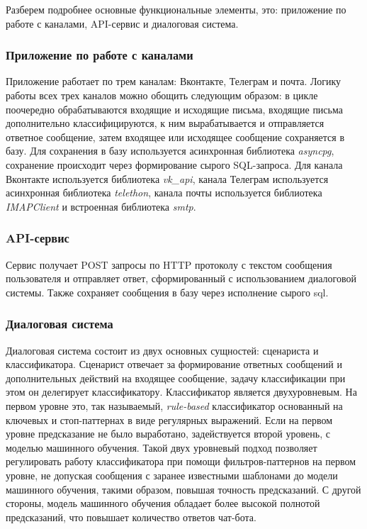     Разберем подробнее основные функциональные элементы, это:
    приложение по работе с каналами, API-сервис и диалоговая система.
    
    \subsubsection*{Приложение по работе с каналами}
    Приложение работает по трем каналам: Вконтакте, Телеграм и почта. Логику работы всех трех каналов можно обощить
    следующим образом: в цикле поочередно обрабатываются входящие  и исходящие письма, входящие письма дополнительно
    классифицируются, к ним вырабатывается и отправляется ответное сообщение, затем входящее или исходящее сообщение
    сохраняется в базу. Для сохранения в базу используется асинхронная библиотека \textit{asyncpg},
    сохранение происходит через формирование сырого SQL-запроса.
    Для канала Вконтакте используется библиотека \textit{vk\_api},
    канала Телеграм используется асинхронная библиотека \textit{telethon},
    канала почты используется библиотека \textit{IMAPClient}\cite{docs.imap} и встроенная библиотека \textit{smtp}.

    \subsubsection*{API-сервис}
    Сервис получает POST запросы по HTTP протоколу с текстом сообщения пользователя и отправляет ответ,
    сформированный с использованием диалоговой системы. Также сохраняет сообщения в базу через исполнение сырого sql.

    \subsubsection*{Диалоговая система}
    Диалоговая система состоит из двух основных сущностей: сценариста и классификатора. Сценарист отвечает за формирование ответных
    сообщений и дополнительных действий на входящее сообщение, задачу классификации при этом он делегирует классификатору.
    Классификатор является двухуровневым. На первом уровне это, так называемый, \textit{rule-based} классификатор
    основанный на ключевых и стоп-паттернах в виде регулярных выражений. Если на первом уровне предсказание не было выработано,
    задействуется второй уровень, с моделью машинного обучения. Такой двух уровневый подход позволяет
    регулировать работу классификатора при помощи фильтров-паттернов на первом уровне, не допуская сообщения с
    заранее известными шаблонами до модели машинного обучения, такими образом, повышая точность предсказаний.
    С другой стороны, модель машинного обучения обладает более высокой полнотой предсказаний, что повышает
    количество ответов чат-бота.


